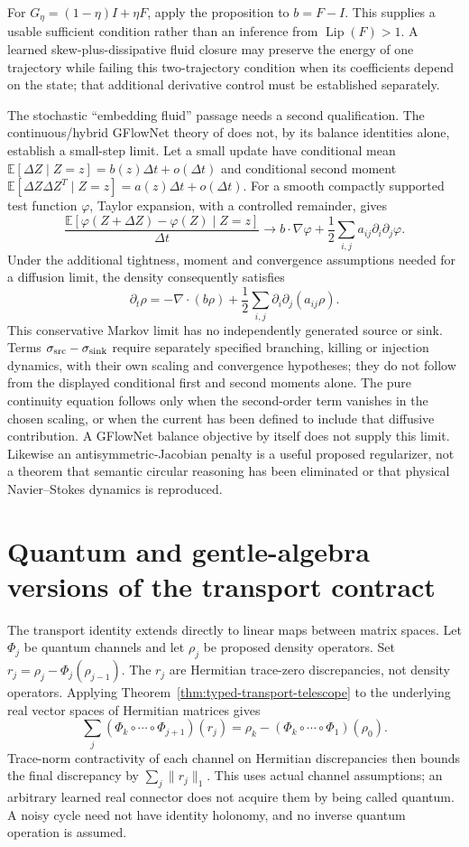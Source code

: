 For $G_\eta=(1-\eta)I+\eta F$, apply the proposition to $b=F-I$.
This supplies a usable sufficient condition rather than an inference from
$\operatorname{Lip}(F)>1$. A learned skew-plus-dissipative fluid closure may
preserve the energy of one trajectory while failing this two-trajectory
condition when its coefficients depend on the state; that additional
derivative control must be established separately.

The stochastic ``embedding fluid'' passage needs a second qualification.
The continuous/hybrid GFlowNet theory of \citet{ToricAuditLahlou2023}
does not, by its balance identities alone, establish a small-step limit.
Let a small update have conditional mean
$\mathbb E[\Delta Z\mid Z=z]=b(z)\Delta t+o(\Delta t)$ and conditional
second moment
$\mathbb E[\Delta Z\Delta Z^T\mid Z=z]=a(z)\Delta t+o(\Delta t)$.
For a smooth compactly supported test function $\varphi$, Taylor expansion,
with a controlled remainder, gives
\[
 \frac{\mathbb E[\varphi(Z+\Delta Z)-\varphi(Z)\mid Z=z]}{\Delta t}
 \longrightarrow b\cdot\nabla\varphi+
 \frac12\sum_{i,j}a_{ij}\partial_i\partial_j\varphi.
\]
Under the additional tightness, moment and convergence assumptions needed
for a diffusion limit, the density consequently satisfies
\[
 \partial_t\rho=-\nabla\cdot(b\rho)
 +\frac12\sum_{i,j}\partial_i\partial_j(a_{ij}\rho).
\]
This conservative Markov limit has no independently generated source or sink.
Terms $\sigma_{\rm src}-\sigma_{\rm sink}$ require separately specified
branching, killing or injection dynamics, with their own scaling and
convergence hypotheses; they do not follow from the displayed conditional
first and second moments alone.
The pure continuity equation follows only when the second-order term
vanishes in the chosen scaling, or when the current has been defined to
include that diffusive contribution. A GFlowNet balance objective by itself
does not supply this limit. Likewise an antisymmetric-Jacobian penalty is a
useful proposed regularizer, not a theorem that semantic circular reasoning
has been eliminated or that physical Navier--Stokes dynamics is reproduced.

\section{Quantum and gentle-algebra versions of the transport contract}

The transport identity extends directly to linear maps between matrix
spaces. Let $\Phi_j$ be quantum channels and let $\rho_j$ be proposed
density operators. Set $r_j=\rho_j-\Phi_j(\rho_{j-1})$. The $r_j$ are
Hermitian trace-zero discrepancies, not density operators. Applying
Theorem~\ref{thm:typed-transport-telescope} to the underlying real vector
spaces of Hermitian matrices gives
\[
 \sum_j(\Phi_k\circ\cdots\circ\Phi_{j+1})(r_j)
 =\rho_k-(\Phi_k\circ\cdots\circ\Phi_1)(\rho_0).
\]
Trace-norm contractivity of each channel on Hermitian discrepancies then
bounds the final discrepancy by $\sum_j\|r_j\|_1$. This uses actual channel
assumptions; an arbitrary learned real connector does not acquire them by
being called quantum. A noisy cycle need not have identity holonomy, and
no inverse quantum operation is assumed.

